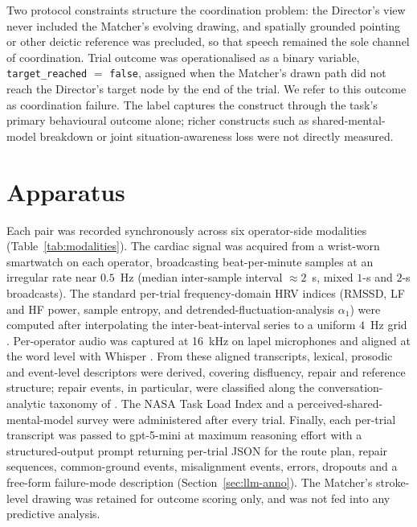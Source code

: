 Two protocol constraints structure the coordination problem: the Director's view never included the Matcher's evolving drawing, and spatially grounded pointing or other deictic reference was precluded, so that speech remained the sole channel of coordination. Trial outcome was operationalised as a binary variable, \texttt{target\_reached} $=$ \texttt{false}, assigned when the Matcher's drawn path did not reach the Director's target node by the end of the trial. We refer to this outcome as coordination failure. The label captures the construct through the task's primary behavioural outcome alone; richer constructs such as shared-mental-model breakdown \cite{cannonbowers1993shared,mohammed2010metaphor} or joint situation-awareness loss \cite{salmon2008what,stanton2017state} were not directly measured.

\section{Apparatus}
Each pair was recorded synchronously across six operator-side modalities (Table~\ref{tab:modalities}). The cardiac signal was acquired from a wrist-worn smartwatch on each operator, broadcasting beat-per-minute samples at an irregular rate near $0.5$~Hz (median inter-sample interval $\approx 2$~s, mixed $1$-s and $2$-s broadcasts). The standard per-trial frequency-domain HRV indices (RMSSD, LF and HF power, sample entropy, and detrended-fluctuation-analysis $\alpha_1$) were computed after interpolating the inter-beat-interval series to a uniform $4$~Hz grid \cite{shaffer2017hrv,shaffer2014healthy,task1996heart}. Per-operator audio was captured at 16~kHz on lapel microphones and aligned at the word level with Whisper \cite{radford2023whisper}. From these aligned transcripts, lexical, prosodic and event-level descriptors were derived, covering disfluency, repair and reference structure; repair events, in particular, were classified along the conversation-analytic taxonomy of \cite{schegloff1977preference,schegloff1992repair}. The NASA Task Load Index \cite{hart1988development,hart2006nasa} and a perceived-shared-mental-model survey \cite{cooke2003measuring,mathieu2000influence} were administered after every trial. Finally, each per-trial transcript was passed to gpt-5-mini \cite{openai2025gpt5} at maximum reasoning effort with a structured-output prompt returning per-trial JSON for the route plan, repair sequences, common-ground events, misalignment events, errors, dropouts and a free-form failure-mode description (Section~\ref{sec:llm-anno}). The Matcher's stroke-level drawing was retained for outcome scoring only, and was not fed into any predictive analysis.

